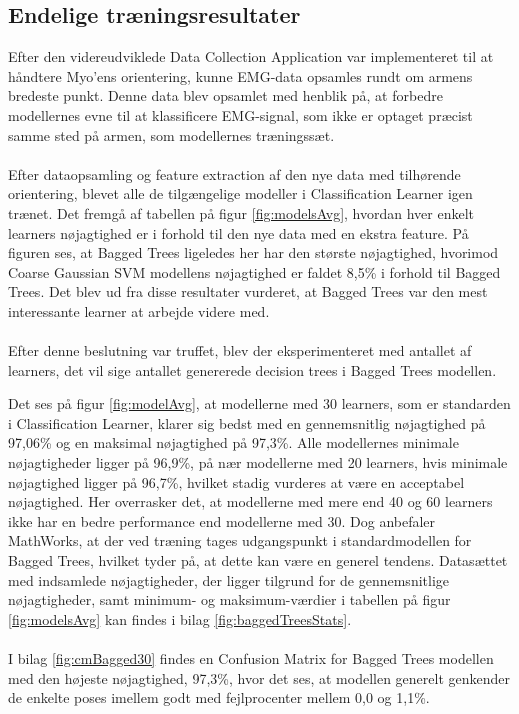  \subsection{Endelige træningsresultater}
 Efter den videreudviklede Data Collection Application var implementeret til at håndtere Myo'ens orientering, kunne EMG-data opsamles rundt om armens bredeste punkt. Denne data blev opsamlet med henblik på, at forbedre modellernes evne til at klassificere EMG-signal, som ikke er optaget præcist samme sted på armen, som modellernes træningssæt.\\\\
 Efter dataopsamling og feature extraction af den nye data med tilhørende orientering, blevet alle de tilgængelige modeller i Classification Learner igen trænet. Det fremgå af tabellen på figur \ref{fig:modelsAvg}, hvordan hver enkelt learners nøjagtighed er i forhold til den nye data med en ekstra feature. På figuren ses, at Bagged Trees ligeledes her har den største nøjagtighed, hvorimod Coarse Gaussian SVM modellens nøjagtighed er faldet 8,5\% i forhold til Bagged Trees. Det blev ud fra disse resultater vurderet, at Bagged Trees var den mest interessante learner at arbejde videre med.
 \\\\ 
Efter denne beslutning var truffet, blev der eksperimenteret med antallet af learners, det vil sige antallet genererede decision trees i Bagged Trees modellen.

Det ses på figur \ref{fig:modelAvg}, at modellerne med 30 learners, som er standarden i Classification Learner, klarer sig bedst med en gennemsnitlig nøjagtighed på 97,06\% og en maksimal nøjagtighed på 97,3\%. Alle modellernes minimale nøjagtigheder ligger på 96,9\%, på nær modellerne med 20 learners, hvis minimale nøjagtighed ligger på 96,7\%, hvilket stadig vurderes at være en acceptabel nøjagtighed. Her overrasker det, at modellerne med mere end 40 og 60 learners ikke har en bedre performance end modellerne med 30. Dog anbefaler MathWorks, at der ved træning tages udgangspunkt i standardmodellen for 
Bagged Trees\citep{matFastModels}, hvilket tyder på, at dette kan være en generel tendens. Datasættet med indsamlede nøjagtigheder, der ligger tilgrund for de gennemsnitlige nøjagtigheder, samt minimum- og maksimum-værdier i tabellen på figur \ref{fig:modelsAvg} kan findes i bilag \ref{fig:baggedTreesStats}.\\\\
I bilag \ref{fig:cmBagged30} findes en Confusion Matrix for Bagged Trees modellen med den højeste nøjagtighed, 97,3\%, hvor det ses, at modellen generelt genkender de enkelte poses imellem godt med fejlprocenter mellem 0,0 og 1,1\%. 

